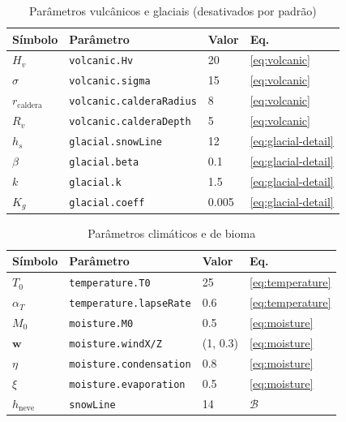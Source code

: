 \documentclass[11pt,a4paper]{article}
\begin{document}
\begin{table}[H]
\centering
\caption{Parâmetros vulcânicos e glaciais (desativados por padrão)}
\label{tab:volcanic}
\begin{tabular}{@{}llll@{}}
\toprule
\textbf{Símbolo} & \textbf{Parâmetro} & \textbf{Valor} & \textbf{Eq.} \\
\midrule
$H_v$              & \texttt{volcanic.Hv}           & 20 & \eqref{eq:volcanic} \\
$\sigma$           & \texttt{volcanic.sigma}        & 15 & \eqref{eq:volcanic} \\
$r_{\text{caldera}}$ & \texttt{volcanic.calderaRadius}& 8  & \eqref{eq:volcanic} \\
$R_v$              & \texttt{volcanic.calderaDepth} & 5  & \eqref{eq:volcanic} \\
$h_s$              & \texttt{glacial.snowLine}      & 12 & \eqref{eq:glacial-detail} \\
$\beta$            & \texttt{glacial.beta}          & 0.1 & \eqref{eq:glacial-detail} \\
$k$                & \texttt{glacial.k}             & 1.5 & \eqref{eq:glacial-detail} \\
$K_g$              & \texttt{glacial.coeff}         & 0.005 & \eqref{eq:glacial-detail} \\
\bottomrule
\end{tabular}
\end{table}

\begin{table}[H]
\centering
\caption{Parâmetros climáticos e de bioma}
\label{tab:biome}
\begin{tabular}{@{}llll@{}}
\toprule
\textbf{Símbolo} & \textbf{Parâmetro} & \textbf{Valor} & \textbf{Eq.} \\
\midrule
$T_0$       & \texttt{temperature.T0}         & 25   & \eqref{eq:temperature} \\
$\alpha_T$  & \texttt{temperature.lapseRate}  & 0.6  & \eqref{eq:temperature} \\
$M_0$       & \texttt{moisture.M0}            & 0.5  & \eqref{eq:moisture} \\
$\mathbf{w}$& \texttt{moisture.windX/Z}       & (1, 0.3) & \eqref{eq:moisture} \\
$\eta$      & \texttt{moisture.condensation}  & 0.8  & \eqref{eq:moisture} \\
$\xi$       & \texttt{moisture.evaporation}   & 0.5  & \eqref{eq:moisture} \\
$h_{\text{neve}}$ & \texttt{snowLine}         & 14   & $\mathcal{B}$ \\
\bottomrule
\end{tabular}
\end{table}
\end{document}
